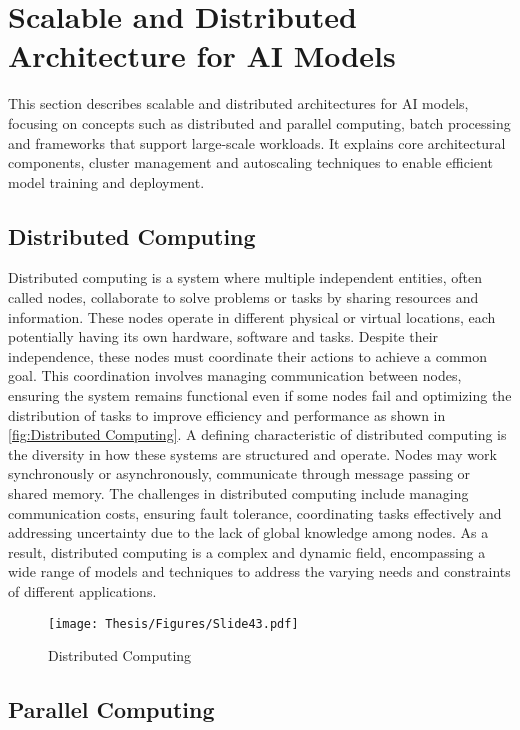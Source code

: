 \section{Scalable and Distributed Architecture for AI Models}

This section describes scalable and distributed architectures for AI models, focusing on concepts such as distributed and parallel computing, batch processing and frameworks that support large-scale workloads. It explains core architectural components, cluster management and autoscaling techniques to enable efficient model training and deployment.

\subsection{Distributed Computing}

Distributed computing is a system where multiple independent entities, often called nodes, collaborate to solve problems or tasks by sharing resources and information. These nodes operate in different physical or virtual locations, each potentially having its own hardware, software and tasks. Despite their independence, these nodes must coordinate their actions to achieve a common goal. This coordination involves managing communication between nodes, ensuring the system remains functional even if some nodes fail and optimizing the distribution of tasks to improve efficiency and performance as shown in \autoref{fig:Distributed Computing}. A defining characteristic of distributed computing is the diversity in how these systems are structured and operate. Nodes may work synchronously or asynchronously, communicate through message passing or shared memory. The challenges in distributed computing include managing communication costs, ensuring fault tolerance, coordinating tasks effectively and addressing uncertainty due to the lack of global knowledge among nodes. As a result, distributed computing is a complex and dynamic field, encompassing a wide range of models and techniques to address the varying needs and constraints of different applications. \cite{podc_roger_2015}

\captionsetup{justification=centering}
\begin{figure}[h]
\centering
\texttt{[image: Thesis/Figures/Slide43.pdf]}
\caption{\label{fig:Distributed Computing}Distributed Computing \cite{parallel_vs_distributed}}
\end{figure}

\subsection{Parallel Computing}

